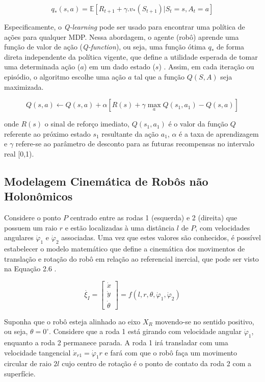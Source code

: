 \documentclass[a4paper]{ifacconf}
\begin{document}
\begin{equation}
q_{*}(s,a) = \mathbb{E}[R_{t+1}+ \gamma .v_{*}(S_{t+1})|S_{t}=s,A_{t}=a]
\end{equation}

Especificamente, o \emph{Q-learning} pode ser usado para encontrar uma política de ações para qualquer MDP. Nessa abordagem, o agente (robô) aprende uma função de valor de ação (\emph{Q-function}), ou seja, uma função ótima $q_{*}$ de forma direta independente da política vigente, que define a utilidade esperada de tomar uma determinada ação ($a$) em um dado estado ($s$) \citep{Watkins92q-learning}. Assim, em cada iteração ou episódio, o algoritmo escolhe uma ação $a$ tal que a função $Q(S,A)$ seja maximizada.

\begin{equation}
Q(s,a) \leftarrow Q(s,a) + \alpha [R(s) + \gamma \max_{a} Q(s_1,a_1) - Q(s,a)]
\end{equation}

onde $R(s)$ o sinal de reforço imediato, $ Q(s_1,a_1)$ é o valor da função $Q$ referente ao próximo estado $s_1$ resultante da ação $a_1$, $\alpha$ é a taxa de aprendizagem e $\gamma$ refere-se ao parâmetro de desconto para as futuras recompensas no intervalo real [0,1).

\subsection{Modelagem Cinemática de Robôs não Holonômicos}

Considere o ponto $P$ centrado entre as rodas 1 (esquerda) e 2 (direita) que possuem um raio $r$ e estão localizadas à uma distância $l$ de $P$, com velocidades angulares $\dot{\varphi}_{1}$ e $\dot{\varphi}_{2}$ associadas. Uma vez que estes valores são conhecidos, é possível estabelecer o modelo matemático que define a cinemática dos movimentos de translação e rotação do robô em relação ao referencial inercial, que pode ser visto na Equação 2.6 \citep{intro_to_auto_robots}.

\begin{equation}
\dot{\xi_{I}} =
\begin{bmatrix}
\dot{x} \\
\dot{y} \\
\dot{\theta}
\end{bmatrix}=f(l,r,\theta,\dot{\varphi}_{1},\dot{\varphi}_{2}) 
\end{equation}

Suponha que o robô esteja alinhado ao eixo $X_{R}$ movendo-se no sentido positivo, ou seja, $\theta = 0^{\circ}$. Considere que a roda 1 está girando com velocidade angular $\dot{\varphi}_{1}$, enquanto a roda 2 permanece parada. A roda 1 irá transladar com uma velocidade tangencial $\dot{x}_{r1} = \dot{\varphi}_{1}r$ e fará com que o robô faça um movimento circular de raio $2l$ cujo centro de rotação é o ponto de contato da roda 2 com a superfície.
\end{document}
